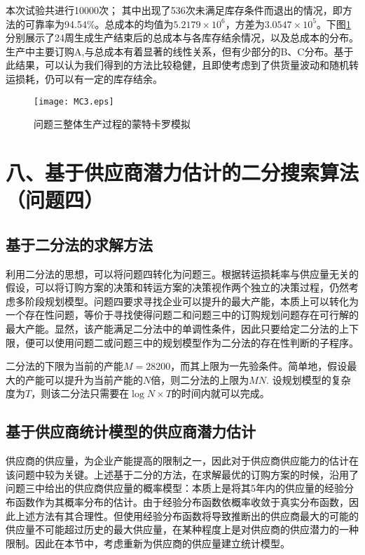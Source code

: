 \documentclass{my_paper}
\begin{document}
本次试验共进行10000次； 其中出现了536次未满足库存条件而退出的情况，即方法的可靠率为94.54\%。总成本的均值为$5.2179\times 10^6$，方差为$3.0547\times 10^5$。下图\ref{MC3}分别展示了24周生成生产结束后的总成本与各库存结余情况，以及总成本的分布。生产中主要订购A,与总成本有着显著的线性关系，但有少部分的B、C分布。基于此结果，可以认为我们得到的方法比较稳健，且即使考虑到了供货量波动和随机转运损耗，仍可以有一定的库存结余。

\begin{figure}[htbp]
\texttt{[image: MC3.eps]}
\caption{问题三整体生产过程的蒙特卡罗模拟} \label{MC3}
\end{figure}

\section{八、基于供应商潜力估计的二分搜索算法（问题四）}

\subsection{基于二分法的求解方法}
利用二分法的思想，可以将问题四转化为问题三。根据转运损耗率与供应量无关的假设，可以将订购方案的决策和转运方案的决策视作两个独立的决策过程，仍然考虑多阶段规划模型。问题四要求寻找企业可以提升的最大产能，本质上可以转化为一个存在性问题，等价于寻找使得问题二和问题三中的订购规划问题存在可行解的最大产能。显然，该产能满足二分法中的单调性条件，因此只要给定二分法的上下限，便可以使用问题二或问题三中的规划模型作为二分法的存在性判断的子程序。

二分法的下限为当前的产能$M=28200$，而其上限为一先验条件。简单地，假设最大的产能可以提升为当前产能的$N$倍，则二分法的上限为$MN$. 设规划模型的复杂度为$T$，则该二分法只需要在$\log{N} \times T$的时间内就可以完成。

\subsection{基于供应商统计模型的供应商潜力估计}

供应商的供应量，为企业产能提高的限制之一，因此对于供应商供应能力的估计在该问题中较为关键。上述基于二分的方法，在求解最优的订购方案的时候，沿用了问题三中给出的供应商供应量的概率模型：本质上是将其5年内的供应量的经验分布函数作为其概率分布的估计。由于经验分布函数依概率收敛于真实分布函数，因此上述方法有其合理性。但使用经验分布函数将导致推断出的供应商最大的可能的供应量不可能超过历史的最大供应量，在某种程度上是对供应商的供应潜力的一种限制。因此在本节中，考虑重新为供应商的供应量建立统计模型。
\end{document}

